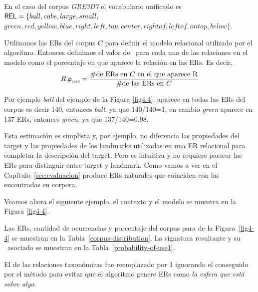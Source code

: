 En el caso del corpus \textit{GRE3D7} el vocabulario unificado es 
$\textsf{REL} = \{ball, cube, large, small,$\\
$green, red, yellow, blue, right, left, top, center, rightof, leftof, ontop,
below\} $.

 Utilizamos las ERs del corpus $C$
para definir el modelo relacional utilizado por el algoritmo. Entonces 
definimos el valor de \puse\ para cada una de las relaciones en el modelo como el
porcentaje en que aparece la relaci\'on en las ERs. Es decir,
\begin{equation} \label{eq1}
R.\textsf{p}_\textit{use} = \frac {\#\mbox{de ERs en $C$ en el que aparece R}} {\#\mbox{de las ERs en $C$}}
\end{equation}

Por ejemplo {\it ball} del ejemplo de la Figura \ref{fig4-4}, aparece en todas las ERs del corpus es decir 140, entonces {\it ball}. ya que 140/140=1, en cambio {\it green} aparece en 137 ERs, entonces {\it green}. ya que 137/140=0.98.

Esta estimaci\'on es simplista y, por ejemplo, no 
diferencia las propiedades del target y las propiedades de
los landmarks utilizadas en una ER relacional para completar la descripci\'on
del target. Pero es intuitiva y no requiere parsear las ERs para distinguir entre target y landmark. Como vamos a ver
en el Cap\'itulo~\ref{sec:evaluacion} produce ERs naturales
que coinciden con las encontradas en corpora.

Veamos ahora el siguiente ejemplo, el contexto y el modelo se muestra en la Figura \ref{fig4-4}.


Las ERs, cantidad de ocurrencias y porcentaje del corpus para de la Figura~\ref{fig4-4} se muestran en la Tabla~\ref{corpus-distribution}. La signatura resultante y su \puse\ asociado se muestran en la Tabla~\ref{probability-of-use1}.

El \puse de las relaciones taxon\'omicas fue reemplazado por 1 ignorando el \puse conseguido por el m\'etodo para evitar que el algoritmo genere ERs como {\it la esfera que est\'a sobre algo}.


